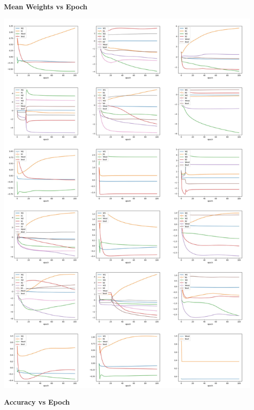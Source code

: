 \documentclass[12pt]{article}
\begin{document}
\textbf{Mean Weights vs Epoch}

\includegraphics[scale=0.145]{NCAA_18_weights.jpg} \newpage 

\textbf{Accuracy vs Epoch}
\end{document}

